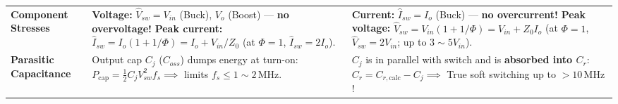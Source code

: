 \begin{center}
\begin{tabularx}{\textwidth}{@{} >{\raggedright\arraybackslash}p{2.6cm} >{\raggedright\arraybackslash}X >{\raggedright\arraybackslash}X @{}}
\textbf{Component Stresses} &
\textbf{Voltage:} $\hat{V}_{sw} = V_{in}$ (Buck), $V_o$ (Boost) --- \textbf{no overvoltage!} \newline
\textbf{Peak current:} $\hat{I}_{sw} = I_o(1 + 1/\Phi) = I_o + V_{in}/Z_0$ (at $\Phi=1$, $\hat{I}_{sw} = 2 I_o$). &
\textbf{Current:} $\hat{I}_{sw} = I_o$ (Buck) --- \textbf{no overcurrent!} \newline
\textbf{Peak voltage:} $\hat{V}_{sw} = V_{in}(1 + 1/\Phi) = V_{in} + Z_0 I_o$ (at $\Phi=1$, $\hat{V}_{sw} = 2 V_{in}$; up to $3\sim 5 V_{in}$). \\

\textbf{Parasitic Capacitance} &
Output cap $C_j$ ($C_{oss}$) dumps energy at turn-on: \newline
$P_{\mathrm{cap}} = \tfrac{1}{2} C_j V_{sw}^2 f_s \implies$ limits $f_s \le 1\sim 2\,\si{\mega\hertz}$. &
$C_j$ is in parallel with switch and is \textbf{absorbed into $C_r$}: \newline
$C_r = C_{r,\mathrm{calc}} - C_j \implies$ True soft switching up to $>10\,\si{\mega\hertz}$! \\
\bottomrule
\end{tabularx}
\end{center}

\vspace{-6pt}
